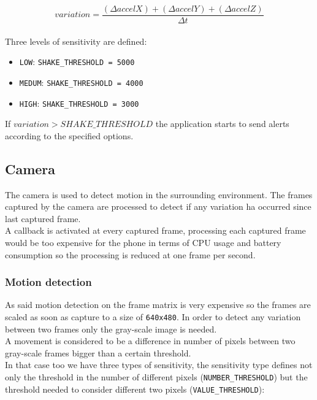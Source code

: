 \documentclass[conference]{IEEEtran}
\begin{document}
\begin{equation}
variation = \frac{(\Delta accelX)+(\Delta accelY)+(\Delta accelZ)}{\Delta t}
\label{eq:accel_variation}
\end{equation}
\vspace{.5cm}\\
Three levels of sensitivity are defined:
\begin{itemize}
	\item \texttt{LOW}: \texttt{SHAKE\_THRESHOLD = 5000}
	\item \texttt{MEDUM}:  \texttt{SHAKE\_THRESHOLD = 4000}
	\item \texttt{HIGH}:  \texttt{SHAKE\_THRESHOLD = 3000}
\end{itemize}

If $variation>SHAKE\_THRESHOLD$ the application starts to send alerts according to the specified options.

\subsection{\textbf{Camera}}
The camera is used to detect motion in the surrounding environment. The frames captured by the camera are processed to detect if any variation ha occurred since last captured frame.\\
A callback is activated at every captured frame, processing each captured frame would be too expensive for the phone in terms of CPU usage and battery consumption so the processing is reduced at one frame per second.\\
\subsubsection{\textbf{Motion detection}}
As said motion detection on the frame matrix is very expensive so the frames are scaled as soon as capture to a size of \texttt{640x480}. In order to detect any variation between two frames only the gray-scale image is needed.\\
A movement is considered to be a difference in number of pixels between two gray-scale frames bigger than a certain threshold.\\
In that case too we have three types of sensitivity, the sensitivity type defines not only the threshold in the number of different pixels (\texttt{NUMBER\_THRESHOLD}) but the threshold needed to consider different two pixels (\texttt{VALUE\_THRESHOLD}):\\
\end{document}
